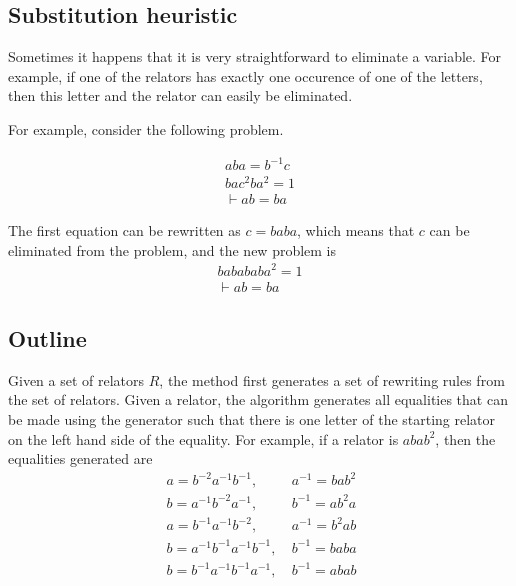 \documentclass[12pt]{article} %
\theoremstyle{definition}
\theoremstyle{definition}
\theoremstyle{definition}
\theoremstyle{definition}
\begin{document}
\subsection{Substitution heuristic}\label{subst}
  Sometimes it happens that it is very straightforward to eliminate a variable.
  For example, if one of the relators has exactly one occurence of one of the
  letters, then this letter and the relator can easily be eliminated.

  For example, consider the following problem.

  \begin{equation}
    \begin{aligned}
      aba =b^{-1}c \\
      bac^2ba^2 = 1 \\
      \vdash ab=ba
    \end{aligned}
  \end{equation}

The first equation can be rewritten as $c = baba$, which means that $c$ can be eliminated
from the problem, and the new problem is
\begin{equation}
  \begin{aligned}
    babababa^2 = 1 \\
    \vdash ab=ba
  \end{aligned}
\end{equation}

\subsection{Outline}

  Given a set of relators $R$, the method first generates a set of rewriting rules
  from the set of relators. Given a relator, the algorithm generates all equalities
  that can be made using the generator such that there is one letter of the starting
  relator on the left hand side of the equality.
  For example, if a relator is $abab^2$, then the equalities generated are
  \begin{equation}\
    \begin{aligned}
      a = b^{-2}a^{-1}b^{-1}, \ & a^{-1} = bab^2 \\
      b = a^{-1}b^{-2}a^{-1},\ & b^{-1} = ab^2a \\
      a=b^{-1}a^{-1}b^{-2}, \ & a^{-1}=b^2ab \\
      b=a^{-1}b^{-1}a^{-1}b^{-1}, \  & b^{-1} = baba \\
      b=b^{-1}a^{-1}b^{-1}a^{-1}, \ & b^{-1} = abab
    \end{aligned}
  \end{equation}
\end{document}
